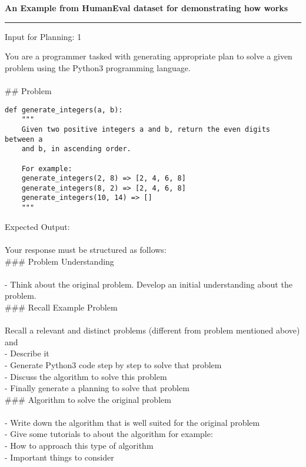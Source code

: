 \vspace{2mm}
\textbf{An Example from HumanEval dataset for demonstrating how \tool works}
\hrule 
\vspace{5mm}
Input for Planning: 1

You are a programmer tasked with generating appropriate plan to solve a given problem using the \*\*Python3\*\* programming language.\\
 \\
\#\# Problem

\begin{verbatim}
def generate_integers(a, b):
    """
    Given two positive integers a and b, return the even digits between a
    and b, in ascending order.

    For example:
    generate_integers(2, 8) => [2, 4, 6, 8]
    generate_integers(8, 2) => [2, 4, 6, 8]
    generate_integers(10, 14) => []
    """
\end{verbatim}

\*\*Expected Output:\*\*\\
 \\
Your response must be structured as follows:\\

\#\#\# Problem Understanding\\
 \\
- Think about the original problem. Develop an initial understanding about the problem.\\

\#\#\# Recall Example Problem\\
 \\
Recall a relevant and distinct problems (different from problem mentioned above) and\\
- Describe it\\
- Generate Python3 code step by step to solve that problem\\
- Discuss the algorithm to solve this problem\\
- Finally generate a planning to solve that problem\\

\#\#\# Algorithm to solve the original problem\\
 \\
- Write down the algorithm that is well suited for the original problem\\
- Give some tutorials to about the algorithm for example:\\
    - How to approach this type of algorithm\\
    - Important things to consider\\

